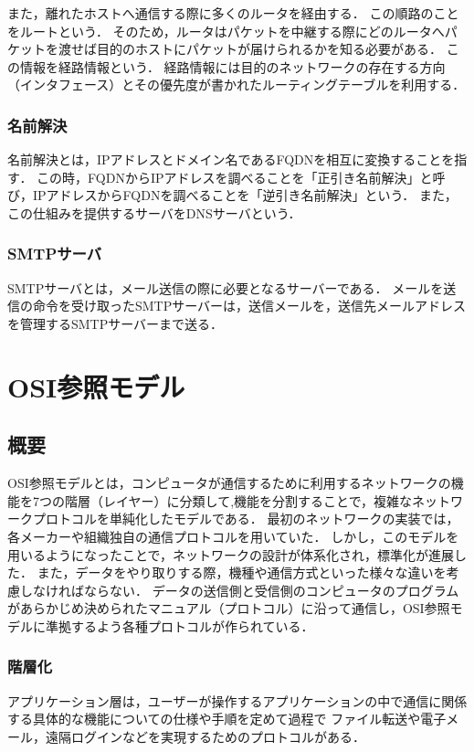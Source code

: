 \documentclass[12pt,a4j,titlepage]{ltjsarticle}
\begin{document}
また，離れたホストへ通信する際に多くのルータを経由する．
この順路のことをルートという．
そのため，ルータはパケットを中継する際にどのルータへパケットを渡せば目的のホストにパケットが届けられるかを知る必要がある．
この情報を経路情報という．
経路情報には目的のネットワークの存在する方向（インタフェース）とその優先度が書かれたルーティングテーブルを利用する．

\subsubsection{名前解決}
名前解決とは，IPアドレスとドメイン名であるFQDNを相互に変換することを指す．
この時，FQDNからIPアドレスを調べることを「正引き名前解決」と呼び，IPアドレスからFQDNを調べることを「逆引き名前解決」という．
また，この仕組みを提供するサーバをDNSサーバという．

\subsubsection{SMTPサーバ}
SMTPサーバとは，メール送信の際に必要となるサーバーである．
メールを送信の命令を受け取ったSMTPサーバーは，送信メールを，送信先メールアドレスを管理するSMTPサーバーまで送る．




\section{OSI参照モデル}
\subsection{概要}
OSI参照モデルとは，コンピュータが通信するために利用するネットワークの機能を7つの階層（レイヤー）に分類して,機能を分割することで，複雑なネットワークプロトコルを単純化したモデルである．
最初のネットワークの実装では，各メーカーや組織独自の通信プロトコルを用いていた．
しかし，このモデルを用いるようになったことで，ネットワークの設計が体系化され，標準化が進展した．
また，データをやり取りする際，機種や通信方式といった様々な違いを考慮しなければならない．
データの送信側と受信側のコンピュータのプログラムがあらかじめ決められたマニュアル（プロトコル）に沿って通信し，OSI参照モデルに準拠するよう各種プロトコルが作られている．

\subsubsection{階層化}
アプリケーション層は，ユーザーが操作するアプリケーションの中で通信に関係する具体的な機能についての仕様や手順を定めて過程で
ファイル転送や電子メール，遠隔ログインなどを実現するためのプロトコルがある．
\end{document}
